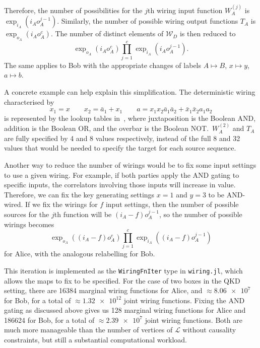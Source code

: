 \documentclass[10pt, a4paper]{article}
\numberwithin{equation}{section} %
\theoremstyle{definition}
\theoremstyle{plain}
\newcommand{\?}{\mathrel{?}} %
\newcommand{\sW}{\mathcal{W}}
\newcommand{\Ls}{\mathcal{L}}
\begin{document}
              Therefore, the number of possibilities for the \(j\)th wiring input function \(W^{(j)}_{A}\) is \(\exp_{i_A}(i_A o_A^{j-1})\). Similarly, the number of possible wiring output functions \(T_{A}\) is \(\exp_{o_A}(i_A o_A^{c})\). The number of distinct elements of \(\sW_D\) is then reduced to
              \begin{equation}
                \exp_{o_A}(i_A o_A^c) \prod_{j=1}^c \exp_{i_A}(i_A o_A^{j-1}).
              \end{equation}
              The same applies to Bob with the appropriate changes of labels \(A \mapsto B\), \(x \mapsto y\), \(a \mapsto b\). 

              A concrete example can help explain this simplification. The deterministic wiring characterised by
              \begin{equation}
                x_1 = x \qquad x_2 = \bar{a}_1 + x_1 \qquad a = x_1x_2\bar{a}_1\bar{a}_2 + \bar{x}_1\bar{x}_2a_1a_2\label{eqn:wiringeg}
              \end{equation}
              is represented by the lookup tables in~, where juxtaposition is the Boolean AND, addition is the Boolean OR, and the overbar is the Boolean NOT.\ \(W_{A}^{(2)}\) and \(T_{A}\) are fully specified by 4 and 8 values respectively, instead of the full 8 and 32 values that would be needed to specify the target for each source sequence.

              Another way to reduce the number of wirings would be to fix some input settings to use a given wiring. For example, if both parties apply the AND gating to specific inputs, the correlators involving those inputs will increase in value. Therefore, we can fix the key generating settings \(x = 1\) and \(y = 3\) to be AND-wired. If we fix the wirings for \(f\) input settings, then the number of possible sources for the \(j\)th function will be \((i_A - f) o_A^{j-1}\), so the number of possible wirings becomes
              \begin{equation}
                \exp_{o_A}((i_A-f) o_A^c) \prod_{j=1}^c \exp_{i_A}((i_A-f) o_A^{j-1})
              \end{equation}
              for Alice, with the analogous relabelling for Bob.

              This iteration is implemented as the \verb`WiringFnIter` type in \verb`wiring.jl`, which allows the maps to fix to be specified. For the case of two boxes in the QKD setting, there are 16384 marginal wiring functions for Alice, and \(\approx \num{8.06e7}\) for Bob, for a total of \(\approx \num{1.32e12}\) joint wiring functions. Fixing the AND gating as discussed above gives us 128 marginal wiring functions for Alice and 186624 for Bob, for a total of \(\approx \num{2.39e7}\) joint wiring functions. Both are much more manageable than the number of vertices of \(\Ls\) without causality constraints, but still a substantial computational workload.
\end{document}
